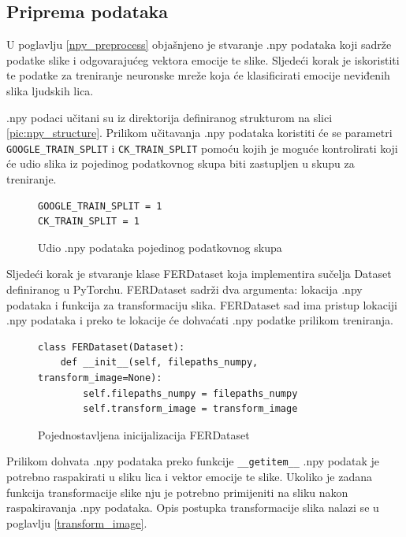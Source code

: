 \documentclass[times, utf8, zavrsni,numeric,pstricks]{fer}
\begin{document}
\subsection{Priprema podataka}
U poglavlju \ref{npy_preprocess} objašnjeno je stvaranje .npy podataka koji sadrže podatke slike i odgovarajućeg vektora emocije te slike. Sljedeći korak je iskoristiti te podatke za treniranje neuronske mreže koja će klasificirati emocije neviđenih slika ljudskih lica.

.npy podaci učitani su iz direktorija definiranog strukturom na slici \ref{pic:npy_structure}. Prilikom učitavanja .npy podataka koristiti će se parametri \lstinline"GOOGLE_TRAIN_SPLIT" i \lstinline"CK_TRAIN_SPLIT" pomoću kojih je moguće kontrolirati koji će udio slika iz pojedinog podatkovnog skupa biti zastupljen u skupu za treniranje.

\begin{figure}[H]
\centering
\begin{Verbatim}[fontsize=\small]
GOOGLE_TRAIN_SPLIT = 1
CK_TRAIN_SPLIT = 1
\end{Verbatim}
\caption{Udio .npy podataka pojedinog podatkovnog skupa}
\label{pic:split_dataset}
\end{figure}
\noindent
Sljedeći korak je stvaranje klase FERDataset  koja implementira sučelja Dataset definiranog u PyTorchu. FERDataset sadrži dva argumenta: lokacija .npy podataka i funkcija za transformaciju slika. FERDataset sad ima pristup lokaciji .npy podataka i preko te lokacije će dohvaćati .npy podatke prilikom treniranja.
\begin{figure}[H]
\centering

\begin{Verbatim}[fontsize=\small]
class FERDataset(Dataset):
    def __init__(self, filepaths_numpy, transform_image=None):
        self.filepaths_numpy = filepaths_numpy
        self.transform_image = transform_image
\end{Verbatim}
\caption{Pojednostavljena inicijalizacija FERDataset}
\label{pic:init_dataset}

\end{figure}
\noindent
Prilikom dohvata .npy podataka preko funkcije \lstinline"__getitem__" .npy podatak je potrebno raspakirati u sliku lica i vektor emocije te slike. Ukoliko je zadana funkcija transformacije slike nju je potrebno primijeniti na sliku nakon raspakiravanja .npy podataka. Opis postupka transformacije slika nalazi se u poglavlju \ref{transform_image}. 
\end{document}

